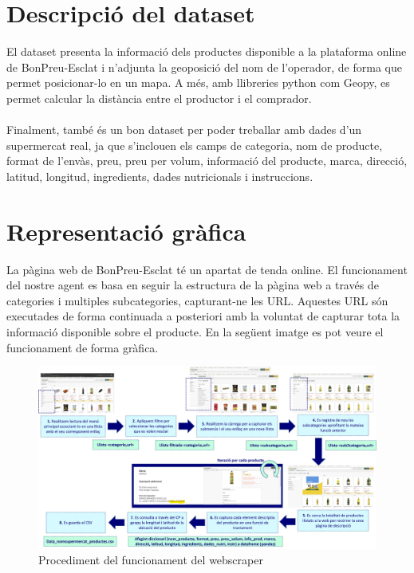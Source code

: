 \documentclass[]{scrartcl}
\begin{document}
\section{Descripció del dataset}
El dataset presenta la informació dels productes disponible a la plataforma online de BonPreu-Esclat i n'adjunta la geoposició del nom de l'operador, de forma que permet posicionar-lo en un mapa.
A més, amb llibreries python com Geopy, es permet calcular la distància entre el productor i el comprador.
\\\\Finalment, també és un bon dataset per poder treballar amb dades d'un supermercat real, ja que s'inclouen els camps de categoria, nom de producte, format de l'envàs, preu, preu per volum, informació del producte, marca, direcció, latitud, longitud, ingredients, dades nutricionals i instruccions.

\section{Representació gràfica}
La pàgina web de BonPreu-Esclat té un apartat de tenda online. El funcionament del nostre agent es basa en seguir la estructura de la pàgina web a través de categories i multiples subcategories, capturant-ne les URL. Aquestes URL són executades de forma continuada a posteriori amb la voluntat de capturar tota la informació disponible sobre el producte. En la següent imatge es pot veure el funcionament de forma gràfica. 
\begin{figure}[!h]
	\includegraphics[width=\linewidth]{../img/infographic_productesProximitatScraper_procediment}
	\caption{Procediment del funcionament del webscraper}
	\label{fig_captura}
\end{figure}
\end{document}
